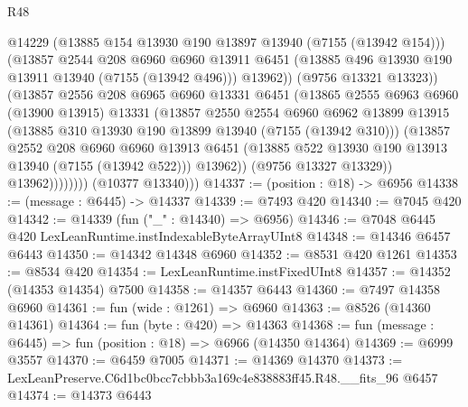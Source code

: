 \begin{lexlean}{R48}
\begin{coremodule}
                          @14229
                          (@13885 @154 @13930 @190 @13897 @13940 (@7155 (@13942 @154)))
                          (@13857
                            @2544
                            @208
                            @6960
                            @6960
                            @13911
                            @6451
                            (@13885 @496 @13930 @190 @13911 @13940 (@7155 (@13942 @496)))
                            @13962))
                        (@9756 @13321 @13323))
                      (@13857
                        @2556
                        @208
                        @6965
                        @6960
                        @13331
                        @6451
                        (@13865
                          @2555
                          @6963
                          @6960
                          (@13900 @13915)
                          @13331
                          (@13857
                            @2550
                            @2554
                            @6960
                            @6962
                            @13899
                            @13915
                            (@13885 @310 @13930 @190 @13899 @13940 (@7155 (@13942 @310)))
                            (@13857
                              @2552
                              @208
                              @6960
                              @6960
                              @13913
                              @6451
                              (@13885 @522 @13930 @190 @13913 @13940 (@7155 (@13942 @522)))
                              @13962))
                          (@9756 @13327 @13329))
                        @13962))))))))
        (@10377 @13340)))
@14337 := (position : @18) -> @6956
@14338 := (message : @6445) -> @14337
@14339 := @7493 @420
@14340 := @7045 @420
@14342 := @14339 (fun ("_" : @14340) => @6956)
@14346 := @7048 @6445 @420 LexLeanRuntime.instIndexableByteArrayUInt8
@14348 := @14346 @6457 @6443
@14350 := @14342 @14348 @6960
@14352 := @8531 @420 @1261
@14353 := @8534 @420
@14354 := LexLeanRuntime.instFixedUInt8
@14357 := @14352 (@14353 @14354) @7500
@14358 := @14357 @6443
@14360 := @7497 @14358 @6960
@14361 := fun (wide : @1261) => @6960
@14363 := @8526 (@14360 @14361)
@14364 := fun (byte : @420) => @14363
@14368 := fun (message : @6445) => fun (position : @18) => @6966 (@14350 @14364)
@14369 := @6999 @3557
@14370 := @6459 @7005
@14371 := @14369 @14370
@14373 := LexLeanPreserve.C6d1bc0bcc7cbbb3a169c4e838883ff45.R48.__fits_96 @6457
@14374 := @14373 @6443

\end{coremodule}
\end{lexlean}
